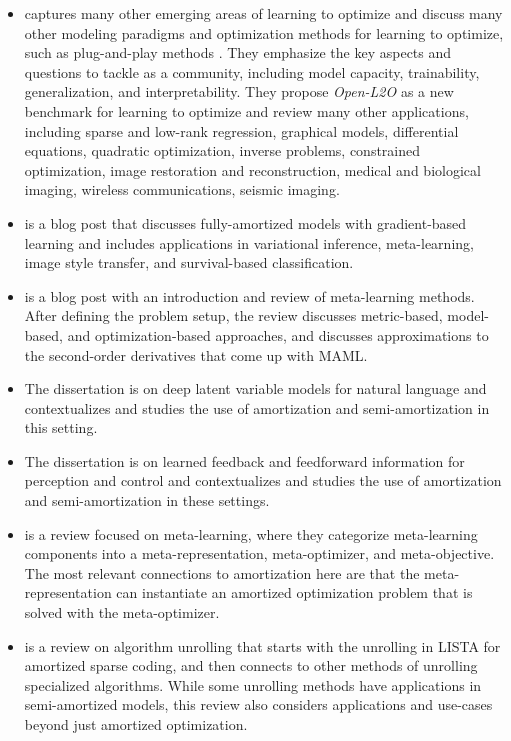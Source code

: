 \documentclass[twoside,11pt]{article}
\begin{document}
\begin{itemize}
\item \citet{chen2021learning} captures many other emerging areas
  of learning to optimize and discuss many other modeling paradigms
  and optimization methods for learning to optimize, such as
  plug-and-play methods \citep{venkatakrishnan2013plug,meinhardt2017learning,rick2017one,zhang2017learning}.
  They emphasize the key aspects and questions to tackle as a community,
  including model capacity, trainability, generalization, and
  interpretability.
  They propose \emph{Open-L2O} as a new benchmark for
  learning to optimize and review many other applications,
  including sparse and low-rank regression, graphical models,
  differential equations, quadratic optimization, inverse problems,
  constrained optimization, image restoration and reconstruction,
  medical and biological imaging, wireless communications,
  seismic imaging.
\item \citet{shu2017amortized} is a blog post that discusses
  fully-amortized models with gradient-based learning
  and includes applications in variational inference,
  meta-learning, image style transfer,
  and survival-based classification.
\item \citet{weng2018metalearning} is a blog post
  with an introduction and review of meta-learning methods.
  After defining the problem setup, the review discusses
  metric-based, model-based, and optimization-based approaches,
  and discusses approximations to the second-order derivatives
  that come up with MAML.
\item The dissertation \citet{kim2020deep} is on deep
  latent variable models for natural language
  and contextualizes and studies the use of amortization and
  semi-amortization in this setting.
\item The dissertation \citet{marino2021learned} is on learned
  feedback and feedforward information for perception and control
  and contextualizes and studies the use of amortization and
  semi-amortization in these settings.
\item \citet{hospedales2020meta} is a review focused on meta-learning,
  where they categorize meta-learning components into a
  meta-representation, meta-optimizer, and meta-objective.
  The most relevant connections to amortization here are that
  the meta-representation can instantiate an
  amortized optimization problem that is solved with the
  meta-optimizer.
\item \citet{monga2021algorithm} is a review on
  algorithm unrolling that starts with the unrolling
  in LISTA \citep{gregor2010learning} for amortized
  sparse coding, and then connects to other methods
  of unrolling specialized algorithms.
  While some unrolling methods have applications in
  semi-amortized models, this review also considers
  applications and use-cases beyond just
  amortized optimization.
\end{itemize}
\end{document}
